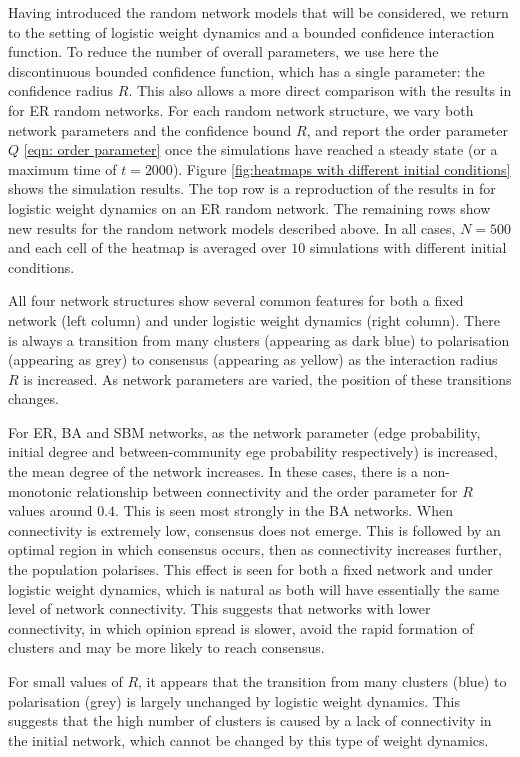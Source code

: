 \documentclass{article}
\begin{document}
Having introduced the random network models that will be considered, we return to the setting of logistic weight dynamics and a bounded confidence interaction function. To reduce the number of overall parameters, we use here the discontinuous bounded confidence function, which has a single parameter: the confidence radius $R$. This also allows a more direct comparison with the results in \cite{nugent2023evolving} for ER random networks. For each random network structure, we vary both network parameters and the confidence bound $R$, and report the order parameter $Q$ \eqref{eqn: order parameter} once the simulations have reached a steady state (or a maximum time of $t=2000$). Figure \ref{fig:heatmaps with different initial conditions} shows the simulation results. The top row is a reproduction of the results in \cite{nugent2023evolving} for logistic weight dynamics on an ER random network. The remaining rows show new results for the random network models described above. In all cases, $N=500$ and each cell of the heatmap is averaged over $10$ simulations with different initial conditions. 

All four network structures show several common features for both a fixed network (left column) and under logistic weight dynamics (right column). There is always a transition from many clusters (appearing as dark blue) to polarisation (appearing as grey) to consensus (appearing as yellow) as the interaction radius $R$ is increased. As network parameters are varied, the position of these transitions changes. 

For ER, BA and SBM networks, as the network parameter (edge probability, initial degree and between-community ege probability respectively) is increased, the mean degree of the network increases. In these cases, there is a non-monotonic relationship between connectivity and the order parameter for $R$ values around $0.4$. This is seen most strongly in the BA networks. When connectivity is extremely low, consensus does not emerge. This is followed by an optimal region in which consensus occurs, then as connectivity increases further, the population polarises. This effect is seen for both a fixed network and under logistic weight dynamics, which is natural as both will have essentially the same level of network connectivity. This suggests that networks with lower connectivity, in which opinion spread is slower, avoid the rapid formation of clusters and may be more likely to reach consensus. 

For small values of $R$, it appears that the transition from many clusters (blue) to polarisation (grey) is largely unchanged by logistic weight dynamics. This suggests that the high number of clusters is caused by a lack of connectivity in the initial network, which cannot be changed by this type of weight dynamics. 
\end{document}
